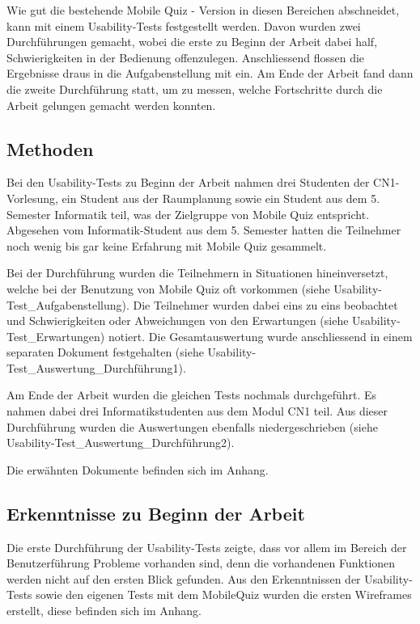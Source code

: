 Wie gut die bestehende Mobile Quiz - Version in diesen Bereichen abschneidet, kann mit einem \gls{Usability-Tests} festgestellt werden. Davon wurden zwei Durchführungen gemacht, wobei die erste zu Beginn der Arbeit dabei half, Schwierigkeiten in der Bedienung offenzulegen. Anschliessend flossen die Ergebnisse draus in die Aufgabenstellung mit ein. Am Ende der Arbeit fand dann die zweite Durchführung statt, um zu messen, welche Fortschritte durch die Arbeit gelungen gemacht werden konnten.

\subsection{Methoden}
Bei den \gls{Usability-Tests} zu Beginn der Arbeit nahmen drei Studenten der \acrfull{CN1}-Vorlesung, ein Student aus der Raumplanung sowie ein Student aus dem 5. Semester Informatik teil, was der Zielgruppe von Mobile Quiz entspricht. Abgesehen vom Informatik-Student aus dem 5. Semester hatten die Teilnehmer noch wenig bis gar keine Erfahrung mit Mobile Quiz gesammelt.

Bei der Durchführung wurden die Teilnehmern in Situationen hineinversetzt, welche bei der Benutzung von Mobile Quiz oft vorkommen (siehe Usability-Test\_Aufgabenstellung). Die Teilnehmer wurden dabei eins zu eins beobachtet und Schwierigkeiten oder Abweichungen von den Erwartungen (siehe Usability-Test\_Erwartungen) notiert. Die Gesamtauswertung wurde anschliessend in einem separaten Dokument festgehalten (siehe Usability-Test\_Auswertung\_Durchführung1).

Am Ende der Arbeit wurden die gleichen Tests nochmals durchgeführt. Es nahmen dabei drei Informatikstudenten aus dem Modul \gls{CN1} teil. Aus dieser Durchführung wurden die Auswertungen ebenfalls niedergeschrieben (siehe Usability-Test\_Auswertung\_Durchführung2).

Die erwähnten Dokumente befinden sich im Anhang.



\subsection{Erkenntnisse zu Beginn der Arbeit}
Die erste Durchführung der \gls{Usability-Tests} zeigte, dass vor allem im Bereich der Benutzerführung Probleme vorhanden sind, denn die vorhandenen Funktionen werden nicht auf den ersten Blick gefunden.
Aus den Erkenntnissen der \gls{Usability-Tests} sowie den eigenen Tests mit dem MobileQuiz wurden die ersten \gls{Wireframes} erstellt, diese befinden sich im Anhang.


